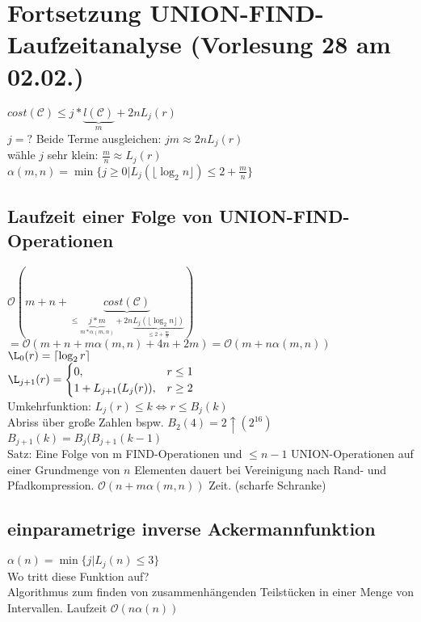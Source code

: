 \section{Fortsetzung UNION-FIND-Laufzeitanalyse  \tiny (Vorlesung 28 am 02.02.)}
$cost(\mathcal{C}) \leq j* \underbrace{l(\mathcal{C})}_{m}+2nL_j(r)$\\
$j=?$ Beide Terme ausgleichen: $jm \approx 2nL_j(r)$\\
wähle $j$ sehr klein: $\frac{m}{n} \approx L_j(r)$\\
$\alpha(m,n) = \min \{ j \geq 0 | L_j(\lfloor \log_2 n\rfloor) \leq 2 + \frac{m}{n}\}$

\subsection{Laufzeit einer Folge von UNION-FIND-Operationen}
$\mathcal{O}(m+n+ \underbrace{ cost(\mathcal{C})}_{\leq \underbrace{j*m}_{m*\alpha(m,n)} + 2n \underbrace{L_j (\lfloor \log_2 n \rfloor)}_{\leq 2+\frac{m}{n}}})$\\
$=\mathcal{O}(m+n+m\alpha (m,n)+4n+2m) = \mathcal{O}(m+n \alpha(m,n))$\\

$\L_0(r) = \lceil \log_2 r \rceil$\\
$\L_{j+1}(r) = \begin{cases} 0, &r\leq 1 \\1+L_{j+1}(L_j(r)),&r \geq 2 \end{cases}$\\

Umkehrfunktion: $L_j(r) \leq k \Leftrightarrow r \leq B_j(k)$\\
Abriss über große Zahlen bspw. $B_2(4) = 2 \uparrow(2^{16})$\\
$B_{j+1}(k) = B_j(B_{j+1}(k-1)$\\
Satz: Eine Folge von m FIND-Operationen und $\leq n-1$ UNION-Operationen auf einer Grundmenge von $n$ Elementen dauert bei Vereinigung nach Rand- und Pfadkompression. $\mathcal{O}(n+m \alpha(m,n))$ Zeit. (scharfe Schranke)\\

\subsection{einparametrige inverse Ackermannfunktion}
$\alpha(n) = \min\{j | L_j(n) \leq 3 \}$\\

Wo tritt diese Funktion auf?\\
Algorithmus zum finden von zusammenhängenden Teilstücken in einer Menge von Intervallen. Laufzeit $\mathcal{O}(n \alpha(n))$

